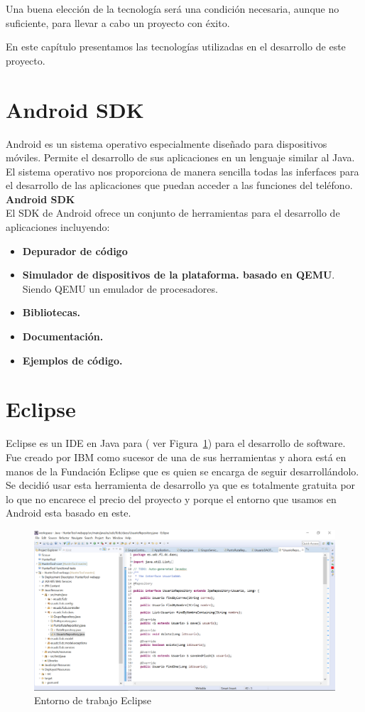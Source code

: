 
Una buena elección de la tecnología será una condición necesaria, aunque no suficiente, para llevar a cabo un proyecto con éxito.

En este capítulo presentamos las tecnologías utilizadas en el desarrollo de este proyecto. 

\section{Android SDK}
Android  \cite{2}  \cite{3} es un sistema operativo especialmente diseñado para dispositivos móviles. Permite el desarrollo de sus aplicaciones en un lenguaje similar al Java. El sistema operativo nos proporciona de manera sencilla todas las inferfaces para el desarrollo de las aplicaciones que puedan acceder a las funciones del teléfono.\\

\textbf{Android SDK}\\

El SDK de Android ofrece un conjunto de herramientas para el desarrollo de aplicaciones incluyendo:
\begin{itemize}
\item \textbf{Depurador de código}
\item \textbf{Simulador de dispositivos de la plataforma. basado en QEMU}. Siendo QEMU  un emulador de procesadores. 
\item\textbf{ Bibliotecas.}
\item \textbf{Documentación.}
\item \textbf{Ejemplos de código.}

\end{itemize}


\section{Eclipse }


Eclipse es un IDE en Java para
( ver Figura~\ref{fig:eclipse}) para el desarrollo de software. Fue creado por IBM como sucesor de una de sus herramientas y ahora está en manos de la Fundación Eclipse que es quien se encarga de seguir desarrollándolo.
Se decidió usar esta herramienta de desarrollo ya que es totalmente gratuita por lo que no encarece el precio del proyecto y porque el entorno que usamos en Android esta basado en este.  
\begin{figure}[H]
		\centering
		\includegraphics[width=\textwidth] {eclipse.png}
		\caption{Entorno de trabajo Eclipse }
		\label{fig:eclipse}
	\end{figure}
	

